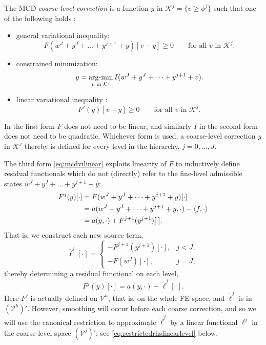 \documentclass[letterpaper,final,12pt,reqno]{amsart}
\theoremstyle{claim}
\newcommand{\ip}[2]{\left<#1,#2\right>}
\numberwithin{equation}{section}
\numberwithin{figure}{section}
\numberwithin{table}{section}
\numberwithin{theorem}{section}
\begin{document}
The MCD \emph{coarse-level correction} is a function $y$ in $\mathcal{K}^j=\{v\ge \phi^j\}$ such that one of the following holds \cite{Tai2003}:
\begin{itemize}
\item general variational inequality:
\begin{equation}
  F(w^J+y^J+\dots+y^{j+1}+y)[v - y] \ge 0 \qquad \text{for all } v \text{ in } \mathcal{K}^j.  \label{eq:mcdvi}
\end{equation}
\item constrained minimization:
\begin{equation}
  y = \mathop{\mathrm{arg\text{-}min}}_{v \text{ in } \mathcal{K}^j} I(w^J+y^J+\dots+y^{j+1}+v).  \label{eq:mcdminimization}
\end{equation}
\item linear variational inequality \cite{GraeserKornhuber2009}:
\begin{equation}
  F^j(y)[v - y] \ge 0 \qquad \text{for all } v \text{ in } \mathcal{K}^j.   \label{eq:mcdvilinear}
\end{equation}
\end{itemize}
In the first form $F$ does not need to be linear, and similarly $I$ in the second form does not need to be quadratic.  Whichever form is used, a coarse-level correction $y$ in $\mathcal{K}^j$ thereby is defined for every level in the hierarchy, $j=0,\dots,J$.

The third form \eqref{eq:mcdvilinear} exploits linearity of $F$ to inductively define residual functionals which do not (directly) refer to the fine-level admissible states $w^J+y^J+\dots+y^{j+1}+y$:
\begin{align}
  F^j(y)[\cdot] &= F(w^J+y^J+\dots+y^{j+1}+y)[\cdot] \label{eq:residuallinearlevelderive} \\
                    &= a(w^J+y^J+\dots+y^{j+1}+y,\cdot) - \ip{f}{\cdot} \notag \\
                    &= a(y,\cdot) + F^{j+1}(y^{j+1})[\cdot]. \notag
\end{align}
That is, we construct each new source term,
\begin{equation}
  \tilde\ell^j[\cdot] = \begin{cases} - F^{j+1}(y^{j+1})[\cdot], & j < J, \\
                                      - F(w^J)[\cdot],   & j = J, \end{cases} \label{eq:rhslinearlevel}
\end{equation}
thereby determining a residual functional on each level,
\begin{equation}
  F^j(y)[\cdot] = a(y,\cdot) - \tilde\ell^j[\cdot].  \label{eq:residuallinearlevel}
\end{equation}
Here $F^j$ is actually defined on $\mathcal{V}^h$, that is, on the whole FE space, and $\tilde\ell^j$ is in $(\mathcal{V}^h)'$.  However, smoothing will occur before each coarse correction, and so we will use the canonical restriction to approximate $\tilde\ell^j$ by a linear functional $\ell^j$ in the coarse-level space $(\mathcal{V}^j)'$; see \eqref{eq:restrictedrhslinearlevel} below.
\end{document}
